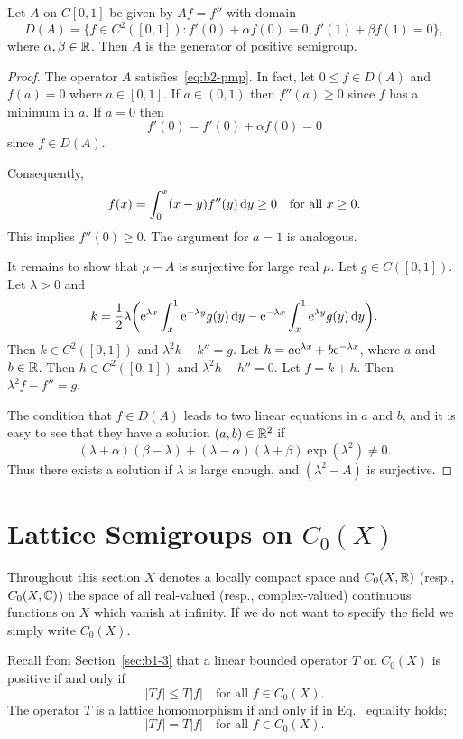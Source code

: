\begin{example}\label{ex:b2-1.24}
Let $A$ on $C[0,1]$ be given by $Af = f''$ with domain 
\[
D(A) = \{f \in C^{2}([0,1]) \colon f'(0) + \alpha f(0) = 0, f'(1) + \beta f(1) = 0\},
\]
where $\alpha,\beta \in \mathbb{R}$.
Then $A$ is the generator of positive semigroup.
\end{example}
\begin{proof}
The operator $A$ satisfies~\eqref{eq:b2-pmp}.
In fact, let $0 \leq f \in D(A)$ and $f(a) = 0$ where $a \in [0,1]$.
If\/ $a \in (0,1)$ then $f''(a) \geq 0$ since $f$ has a minimum in $a$.
If\/ $a = 0$ then 
\[
f'(0) = f'(0) + \alpha f(0) = 0
\]
since $f \in D(A)$.

Consequently, 
%
\[
	f(x) = \int_{0}^{x} (x-y)f''(y) \dy \geq 0 
	\quad \text{for all $x \geq 0$.}
\]
%
This implies $f''(0) \geq 0$.
The argument for $a = 1$ is analogous.

It remains to show that $\mu - A$ is surjective for large real $\mu$.
Let $g \in C([0,1])$.
Let $\lambda > 0$ and 
\[k = \frac{1}{2}\lambda\mleft( \eu^{\lambda x}\int_{x}^{1} \eu^{-\lambda y}g(y)\dy - \eu^{-\lambda x}\int_{x}^{1} \eu^{\lambda y}g(y)\dy \mright).
\]
Then $k \in C^{2}([0,1])$ and $\lambda^{2}k - k'' = g$.
Let $h = a\mathrm{e}^{\lambda x} + b\mathrm{e}^{-\lambda x}$, where $a$ and $b \in \mathbb{R}$.
Then $h \in C^{2}([0,1])$ and $\lambda^{2}h - h'' = 0$.
Let $f = k + h$.
Then $\lambda^{2}f - f'' = g$.

The condition that $f \in D(A)$ leads to two linear equations in $a$ and $b$, and it is easy to see that they have a solution $(a,b) \in \mathbb{R}^{2}$ if\/ 
%
\[
	 (\lambda+\alpha)(\beta-\lambda) + (\lambda-\alpha)(\lambda+\beta)\exp(\lambda^{2}) \neq 0 .
\]
%
Thus there exists a solution if\/ $\lambda$ is large enough, and $(\lambda^{2} - A)$ is surjective.
\end{proof}
\section{Lattice Semigroups on  \texorpdfstring{$C_{0}(X)$}{C_{0}(X)}}\label{sec:b2-2}%
Throughout this section $X$ denotes a locally compact space and $C_{0}(X,\mathbb{R})$ (resp., $C_{0}(X,\mathbb{C})$) the space of all real-valued (resp., complex-valued) continuous functions on $X$ which vanish at infinity.
If we do not want to specify the field we simply write $C_{0}(X)$.

Recall from  Section~\ref{sec:b1-3} that a linear bounded operator $T$ on $C_{0}(X)$ is positive if and only if
\begin{equation}\label{eq:b2-2.1}
|Tf| \leq T|f| \quad \text{for all } f \in C_{0}(X).
\end{equation}
The operator $T$ is a lattice homomorphism if and only if in Eq.~ equality holds; \ie 
\begin{equation}\label{eq:b2-2.2}
|Tf| = T|f| \quad \text{for all } f \in C_{0}(X).
\end{equation}

